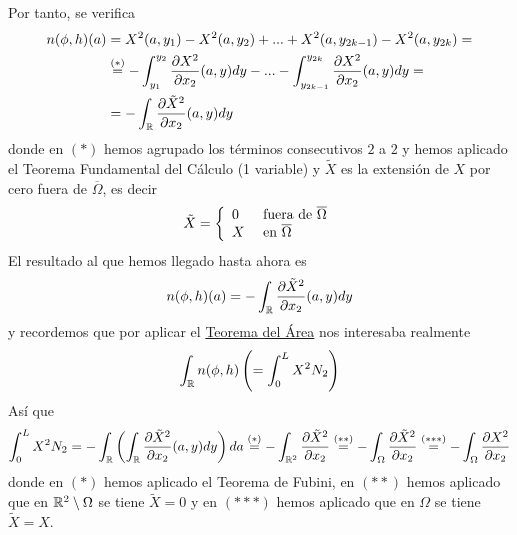 Por tanto, se verifica
\begin{align*}
    n(\phi, h)(a) &= X^2(a,y_1)-X^2(a,y_2) + ... + X^2(a,y_{2k-1}) - X^2(a,y_{2k}) =\\
    &\overset{(\ast)}{=} - \int_{y_1}^{y_2} \frac{\partial X^2}{\partial x_2} (a,y)dy - ... - \int_{y_{2k-1}}^{y_{2k}} \frac{\partial X^2}{\partial x_2} (a,y)dy =\\
    &= -\int_{\mathbb{R}} \frac{\partial \tilde{X}^2}{\partial x_2}(a,y) dy
\end{align*}
donde en $(\ast)$ hemos agrupado los términos consecutivos $2$ a $2$ y hemos aplicado el Teorema Fundamental del Cálculo (1 variable) y $\tilde{X}$ es la extensión de $X$ por cero fuera de $\overline{\Omega}$, es decir
\begin{gather*}
    \tilde{X} = 
    \left\{
        \begin{array}{l l}
            0 & \text{ fuera de $\overline{\Omega}$}\\
            X & \text{ en  $\overline{\Omega}$}
        \end{array}
    \right.
\end{gather*}
El resultado al que hemos llegado hasta ahora es 
\begin{gather*}
    n(\phi, h)(a) = -\int_{\mathbb{R}} \frac{\partial \tilde{X}^2}{\partial x_2}(a,y) dy
\end{gather*}
y recordemos que por aplicar el \hyperref[teo:area]{Teorema del Área} nos interesaba realmente
\begin{gather*}
    \int_{\mathbb{R}} n(\phi, h) \left( = \int_0^L X^2N_2 \right)
\end{gather*}
Así que
\begin{gather*}
    \int_0^L X^2N_2 = - \int_{\mathbb{R}} \left(\int_{\mathbb{R}} \frac{\partial \tilde{X}^2}{\partial x_2}(a,y) dy\right)da \overset{(\ast)}{=} -\int_{\mathbb{R}^2} \frac{\partial \tilde{X}^2}{\partial x_2} \overset{(\ast\ast)}{=} - \int_\Omega \frac{\partial \tilde{X}^2}{\partial x_2} \overset{(\ast\ast\ast)}{=} -\int_\Omega \frac{\partial X^2}{\partial x_2} 
\end{gather*}
donde en $(\ast)$ hemos aplicado el Teorema de Fubini, en $(\ast\ast)$ hemos aplicado que en $\mathbb{R}^2 \setminus\Omega$ se tiene $\tilde{X}=0$ y en $(\ast\ast\ast)$ hemos aplicado que en $\Omega$ se tiene $\tilde{X}=X$.\\


